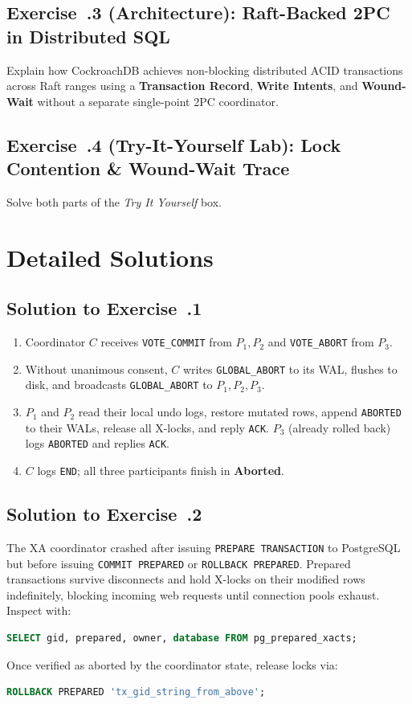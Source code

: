 \subsection*{Exercise~\thechapter.3 (Architecture): Raft-Backed 2PC in Distributed SQL}
Explain how CockroachDB achieves non-blocking distributed ACID transactions across Raft ranges using a \textbf{Transaction Record}, \textbf{Write Intents}, and \textbf{Wound-Wait} without a separate single-point 2PC coordinator.

\subsection*{Exercise~\thechapter.4 (Try-It-Yourself Lab): Lock Contention \& Wound-Wait Trace}
Solve both parts of the \emph{Try It Yourself} box.

\section{Detailed Solutions}

\subsection*{Solution to Exercise~\thechapter.1}
\begin{enumerate}[leftmargin=18pt]
  \item Coordinator $C$ receives \texttt{VOTE\_COMMIT} from $P_1, P_2$ and \texttt{VOTE\_ABORT} from $P_3$.
  \item Without unanimous consent, $C$ writes \texttt{GLOBAL\_ABORT} to its WAL, flushes to disk, and broadcasts \texttt{GLOBAL\_ABORT} to $P_1, P_2, P_3$.
  \item $P_1$ and $P_2$ read their local undo logs, restore mutated rows, append \texttt{ABORTED} to their WALs, release all X-locks, and reply \texttt{ACK}. $P_3$ (already rolled back) logs \texttt{ABORTED} and replies \texttt{ACK}.
  \item $C$ logs \texttt{END}; all three participants finish in \textbf{Aborted}.
\end{enumerate}

\subsection*{Solution to Exercise~\thechapter.2}
The XA coordinator crashed after issuing \texttt{PREPARE TRANSACTION} to PostgreSQL but before issuing \texttt{COMMIT PREPARED} or \texttt{ROLLBACK PREPARED}. Prepared transactions survive disconnects and hold X-locks on their modified rows indefinitely, blocking incoming web requests until connection pools exhaust. Inspect with:
\begin{lstlisting}[language=SQL]
SELECT gid, prepared, owner, database FROM pg_prepared_xacts;
\end{lstlisting}
Once verified as aborted by the coordinator state, release locks via:
\begin{lstlisting}[language=SQL]
ROLLBACK PREPARED 'tx_gid_string_from_above';
\end{lstlisting}

